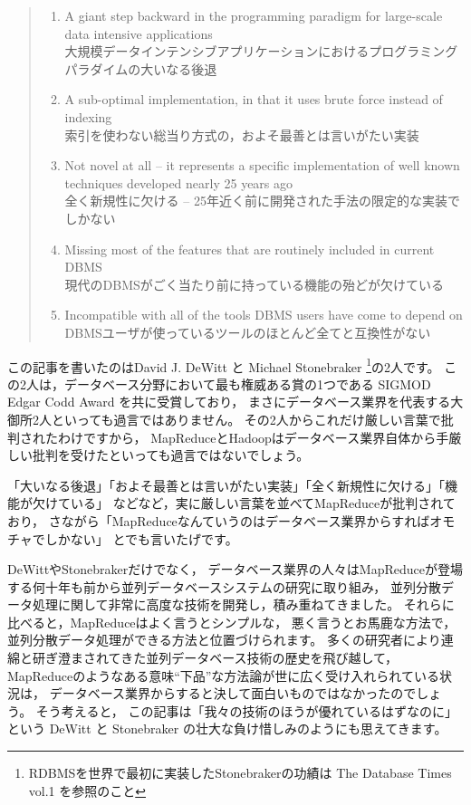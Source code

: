 \begin{quote}
\begin{enumerate}
 \item A giant step backward in the programming paradigm for large-scale data intensive applications \\
	   大規模データインテンシブアプリケーションにおけるプログラミングパラダイムの大いなる後退
 \item A sub-optimal implementation, in that it uses brute force instead of indexing \\
	   索引を使わない総当り方式の，およそ最善とは言いがたい実装
 \item Not novel at all -- it represents a specific implementation of well known techniques developed nearly 25 years ago \\
	   全く新規性に欠ける -- 25年近く前に開発された手法の限定的な実装でしかない
 \item Missing most of the features that are routinely included in current DBMS \\
	   現代のDBMSがごく当たり前に持っている機能の殆どが欠けている
 \item Incompatible with all of the tools DBMS users have come to depend on \\
	   DBMSユーザが使っているツールのほとんど全てと互換性がない
\end{enumerate}
\end{quote}

この記事を書いたのはDavid J. DeWitt と Michael Stonebraker \footnote{RDBMSを世界で最初に実装したStonebrakerの功績は The Database Times vol.1 を参照のこと}の2人です。
この2人は，データベース分野において最も権威ある賞の1つである SIGMOD Edgar Codd Award を共に受賞しており，
まさにデータベース業界を代表する大御所2人といっても過言ではありません。
その2人からこれだけ厳しい言葉で批判されたわけですから，
MapReduceとHadoopはデータベース業界自体から手厳しい批判を受けたといっても過言ではないでしょう。

「大いなる後退」「およそ最善とは言いがたい実装」「全く新規性に欠ける」「機能が欠けている」
などなど，実に厳しい言葉を並べてMapReduceが批判されており，
さながら「MapReduceなんていうのはデータベース業界からすればオモチャでしかない」
とでも言いたげです。

DeWittやStonebrakerだけでなく，
データベース業界の人々はMapReduceが登場する何十年も前から並列データベースシステムの研究に取り組み，
並列分散データ処理に関して非常に高度な技術を開発し，積み重ねてきました。
それらに比べると，MapReduceはよく言うとシンプルな，
悪く言うとお馬鹿な方法で，並列分散データ処理ができる方法と位置づけられます。
多くの研究者により連綿と研ぎ澄まされてきた並列データベース技術の歴史を飛び越して，
MapReduceのようなある意味``下品''な方法論が世に広く受け入れられている状況は，
データベース業界からすると決して面白いものではなかったのでしょう。
そう考えると，
この記事は「我々の技術のほうが優れているはずなのに」
という DeWitt と Stonebraker の壮大な負け惜しみのようにも思えてきます。

